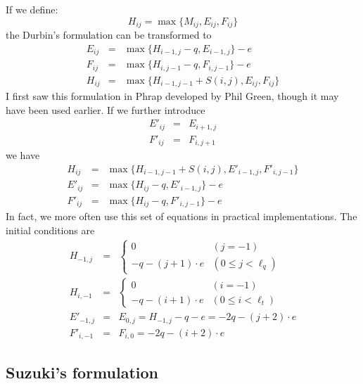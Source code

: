 \documentclass[10pt]{article}
\begin{document}
If we define:
\[H_{ij}=\max\{M_{ij},E_{ij},F_{ij}\}\]
the Durbin's formulation can be transformed to
\begin{eqnarray*}
E_{ij} &=& \max\{H_{i-1,j}-q, E_{i-1,j}\} - e \\
F_{ij} &=& \max\{H_{i,j-1}-q, F_{i,j-1}\} - e \\
H_{ij} &=& \max\{H_{i-1,j-1}+S(i,j), E_{ij}, F_{ij}\}
\end{eqnarray*}
I first saw this formulation in Phrap developed by Phil Green, though it may
have been used earlier. If we further introduce
\begin{eqnarray*}
E'_{ij}&=&E_{i+1,j}\\
F'_{ij}&=&F_{i,j+1}
\end{eqnarray*}
we have
\begin{eqnarray*}
H_{ij} &=& \max\{H_{i-1,j-1}+S(i,j),E'_{i-1,j},F'_{i,j-1}\}\\
E'_{ij}&=& \max\{H_{ij}-q,E'_{i-1,j}\}-e\\
F'_{ij}&=& \max\{H_{ij}-q,F'_{i,j-1}\}-e
\end{eqnarray*}
In fact, we more often use this set of equations in practical implementations.
The initial conditions are
\begin{eqnarray*}
H_{-1,j}&=&
  \left\{\begin{array}{ll}
    0 & (j=-1)\\
	-q-(j+1)\cdot e & (0\le j<\ell_q)
  \end{array}\right.\\
H_{i,-1}&=&
  \left\{\begin{array}{ll}
    0 & (i=-1)\\
	-q-(i+1)\cdot e & (0\le i<\ell_t)
  \end{array}\right.\\
E'_{-1,j}&=&E_{0,j}=H_{-1,j}-q-e=-2q-(j+2)\cdot e\\
F'_{i,-1}&=&F_{i,0}=-2q-(i+2)\cdot e
\end{eqnarray*}

\subsection{Suzuki's formulation}
\end{document}
